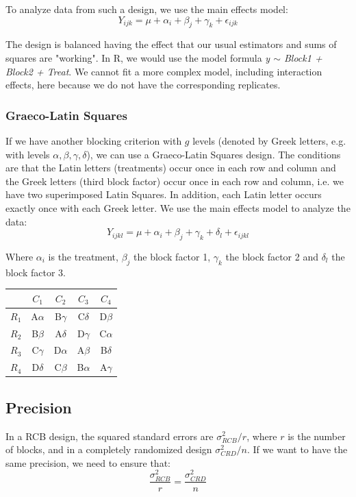 To analyze data from such a design, we use the main effects model:
$$Y_{ijk} = \mu + \alpha_i + \beta_j + \gamma_k + \epsilon_{ijk}$$

The design is balanced having the effect that our usual estimators and sums of squares are "working". In R, we would use the model formula \textit{y $\sim$ Block1 + Block2 + Treat}. We cannot fit a more complex model, including interaction effects, here because we do not have the corresponding replicates.

\subsubsection{Graeco-Latin Squares}

If we have another blocking criterion with $g$ levels (denoted by Greek letters, e.g. with levels $\alpha, \beta, \gamma, \delta$), we can use a Graeco-Latin Squares design. The conditions are that the Latin letters (treatments) occur once in each row and column and the Greek letters (third block factor) occur once in each row and column, i.e. we have two superimposed Latin Squares. In addition, each Latin letter occurs exactly once with each Greek letter. We use the main effects model to analyze the data:
$$Y_{ijkl} = \mu + \alpha_i + \beta_j + \gamma_k + \delta_l + \epsilon_{ijkl}$$

Where $\alpha_i$ is the treatment, $\beta_j$ the block factor 1, $\gamma_k$ the block factor 2 and $\delta_l$ the block factor 3. 

\begin{center}
	\begin{tabular}{c c c c c}
		 & $C_1$ & $C_2$ & $C_3$ & $C_4$\\ \hline
		 $R_1$ & A$\alpha$ & B$\gamma$ & C$\delta$ & D$\beta$ \\ \hline
		 $R_2$ & B$\beta$ & A$\delta$ & D$\gamma$ & C$\alpha$ \\ \hline
		 $R_3$ & C$\gamma$ & D$\alpha$ & A$\beta$ & B$\delta$ \\ \hline
		 $R_4$ & D$\delta$ & C$\beta$ & B$\alpha$ & A$\gamma$ \\ \hline
	\end{tabular}
\end{center}


\subsection{Precision}

In a RCB design, the squared standard errors are $\sigma_{RCB}^2 / r$, where $r$ is the number of blocks, and in a completely randomized design $\sigma_{CRD}^2 / n$. If we want to have the same precision, we need to ensure that:
$$\frac{\sigma_{RCB}^2}{r} = \frac{\sigma_{CRD}^2}{n}$$


